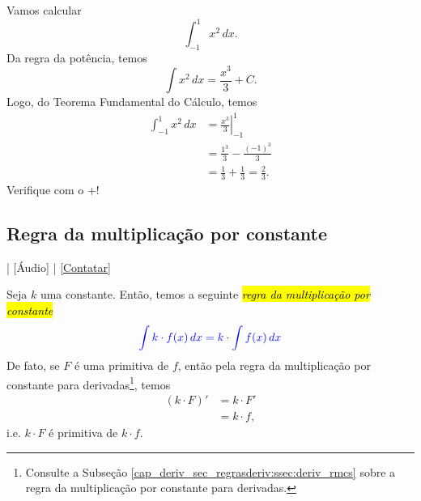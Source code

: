 \begin{ex}
  Vamos calcular
  \begin{equation}
    \int_{-1}^1 x^2\,dx.
  \end{equation}
  Da regra da potência, temos
  \begin{equation}
    \int x^2\,dx = \frac{x^3}{3} + C.
  \end{equation}
  Logo, do Teorema Fundamental do Cálculo, temos
  \begin{align}
    \int_{-1}^1 x^2\,dx &= \left.\frac{x^3}{3}\right|_{-1}^1 \\
                        &= \frac{1^3}{3} - \frac{(-1)^3}{3} \\
                        &= \frac{1}{3} + \frac{1}{3} = \frac{2}{3}.
  \end{align}
    \ifispython
    Verifique com o {\python}+{\sympy}!
    \fi
\end{ex}

\subsection{Regra da multiplicação por constante}

\begin{flushright}
  [Vídeo] | [Áudio] | \href{https://phkonzen.github.io/notas/contato.html}{[Contatar]}
\end{flushright}

Seja $k$ uma constante. Então, temos a seguinte \hl{\emph{regra da multiplicação por constante}}
\begin{equation}
  {\color{blue}\int k\cdot f(x)\,dx = k\cdot \int f(x)\,dx}
\end{equation}
De fato, se $F$ é uma primitiva de $f$, então pela regra da multiplicação por constante para derivadas\footnote{Consulte a Subseção \ref{cap_deriv_sec_regrasderiv:ssec:deriv_rmcs} sobre a regra da multiplicação por constante para derivadas.}, temos
\begin{align}
  (k\cdot F)' &= k\cdot F'\\
              &= k\cdot f,
\end{align}
i.e. $k\cdot F$ é primitiva de $k\cdot f$.

